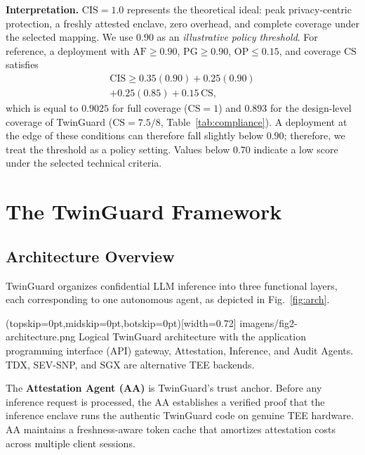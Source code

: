 \documentclass{ieeeaccess}
\begin{document}
\textbf{Interpretation.} $\mathrm{CIS} = 1.0$ represents the theoretical
ideal: peak privacy-centric protection, a freshly attested enclave, zero
overhead, and complete coverage under the selected mapping. We use
$0.90$ as an \emph{illustrative policy threshold}. For reference, a deployment
with $\mathrm{AF}\ge 0.90$, $\mathrm{PG}\ge 0.90$, $\mathrm{OP}\le 0.15$, and
coverage $\mathrm{CS}$ satisfies
\begin{multline}
\label{eq:threshold}
\mathrm{CIS} \ge 0.35(0.90) + 0.25(0.90) \\
+ 0.25(0.85) + 0.15\,\mathrm{CS},
\end{multline}
\noindent which is equal to $0.9025$ for full coverage ($\mathrm{CS}=1$) and
$0.893$ for the design-level coverage of TwinGuard ($\mathrm{CS}=7.5/8$,
Table~\ref{tab:compliance}). A deployment at the edge of these conditions can
therefore fall slightly below $0.90$; therefore, we treat the threshold as a policy setting. Values below $0.70$ indicate a low score under the selected
technical criteria.

\section{The TwinGuard Framework}
\label{sec:framework}

\subsection{Architecture Overview}

TwinGuard organizes confidential LLM inference into three functional layers,
each corresponding to one autonomous agent, as depicted in
Fig.~\ref{fig:arch}.

\Figure[t!](topskip=0pt,midskip=0pt,botskip=0pt)[width=0.72\textwidth]
{imagens/fig2-architecture.png}
{Logical TwinGuard architecture with the application programming interface (API) gateway, Attestation, Inference,
and Audit Agents. TDX, SEV-SNP, and SGX are alternative TEE backends.\label{fig:arch}}


The \textbf{Attestation Agent (AA)} is TwinGuard's trust anchor. Before
any inference request is processed, the AA establishes a verified proof that the inference enclave runs the authentic TwinGuard code on genuine TEE hardware.
AA maintains a freshness-aware token cache that amortizes attestation costs across multiple client sessions.
\end{document}
